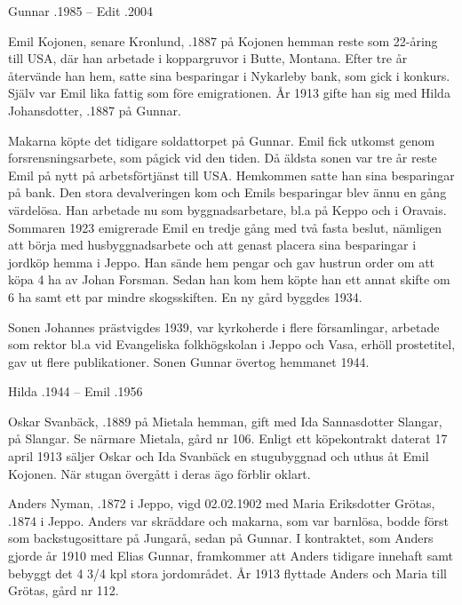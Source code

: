 Gunnar .1985  --  Edit .2004




Emil Kojonen, senare Kronlund, .1887 på Kojonen hemman reste som 22-åring till USA, där han arbetade i koppargruvor i Butte, Montana. Efter tre år återvände han hem, satte sina besparingar i Nykarleby bank, som gick i konkurs. Själv var Emil lika fattig som före emigrationen. År 1913 gifte han sig med Hilda Johansdotter, .1887 på Gunnar.
\begin{jhchildren}
  \item {}
  \item {}
\end{jhchildren}
Makarna köpte det tidigare soldattorpet på Gunnar. Emil fick utkomst genom forsrensningsarbete, som pågick vid den tiden. Då äldsta sonen var tre år reste Emil på nytt på arbetsförtjänst till USA. Hemkommen satte han sina besparingar på bank. Den stora devalveringen kom och Emils besparingar blev ännu en gång värdelösa. Han arbetade nu som byggnadsarbetare, bl.a på Keppo och i Oravais.
Sommaren 1923 emigrerade Emil en tredje gång med två fasta beslut, nämligen att börja med husbyggnadsarbete och att genast placera sina besparingar i jordköp hemma i Jeppo. Han sände hem pengar och gav hustrun order om att köpa 4 ha av Johan Forsman. Sedan han kom hem köpte han ett annat skifte om 6 ha samt ett par mindre skogsskiften. En ny gård byggdes 1934.

Sonen Johannes prästvigdes 1939, var kyrkoherde i flere församlingar, arbetade som rektor bl.a vid  Evangeliska folkhögskolan i Jeppo och Vasa, erhöll prostetitel, gav ut flere publikationer. Sonen Gunnar övertog hemmanet 1944.

Hilda .1944  --  Emil .1956


Oskar Svanbäck, .1889 på Mietala hemman, gift med Ida Sannasdotter Slangar,  på Slangar. Se närmare Mietala, gård nr 106. Enligt ett köpekontrakt daterat 17 april 1913 säljer Oskar och Ida Svanbäck en stugubyggnad och uthus åt Emil Kojonen. När stugan övergått i deras ägo förblir oklart.


Anders Nyman, .1872 i Jeppo, vigd 02.02.1902 med Maria Eriksdotter Grötas, .1874 i Jeppo. Anders var skräddare och makarna, som var barnlösa, bodde först som backstugosittare på Jungarå, sedan på Gunnar. I kontraktet, som Anders gjorde år 1910 med Elias Gunnar, framkommer att Anders tidigare innehaft samt bebyggt det 4 3/4 kpl stora jordområdet. År 1913 flyttade Anders och Maria till Grötas, gård nr 112.


